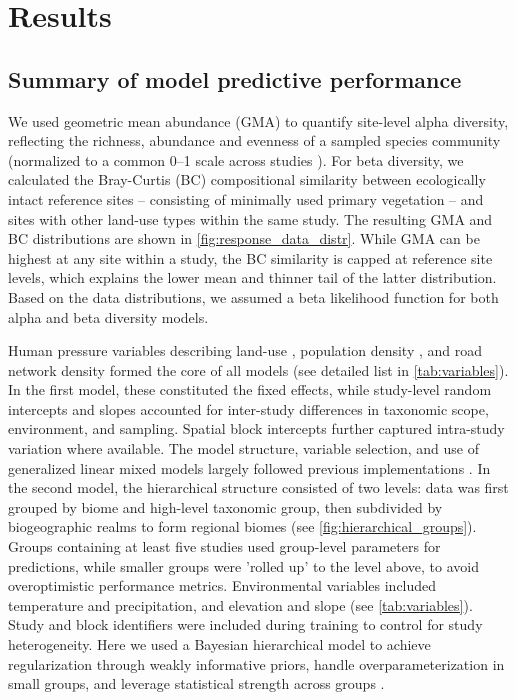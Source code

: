 \section*{Results}
\subsection*{Summary of model predictive performance}

We used geometric mean abundance (GMA) \cite{santini2017} to quantify site-level alpha diversity, reflecting the richness, abundance and evenness of a sampled species community (normalized to a common 0--1 scale across studies \cite{depalma2021}). For beta diversity, we calculated the Bray-Curtis (BC)\cite{bray1957} compositional similarity between ecologically intact reference sites -- consisting of minimally used primary vegetation -- and sites with other land-use types within the same study\cite{depalma2021}. The resulting GMA and BC distributions are shown in \autoref{fig:response_data_distr}. While GMA can be highest at any site within a study, the BC similarity is capped at reference site levels, which explains the lower mean and thinner tail of the latter distribution. Based on the data distributions, we assumed a beta likelihood function for both alpha and beta diversity models.


Human pressure variables describing land-use \cite{hudson2017}, population density \cite{gpw2017},
and road network density \cite{groads2013} formed the core of all models (see detailed list in \autoref{tab:variables}). In the first model, these constituted the fixed effects, while study-level random intercepts and slopes accounted for inter-study differences in taxonomic scope, environment, and sampling. Spatial block intercepts further captured intra-study variation where available. The model structure, variable selection, and use of generalized linear mixed models largely followed previous implementations \cite{newbold2015,depalma2021,bevan2024,schipper2020}. In the second model, the hierarchical structure consisted of two levels: data was first grouped by biome and high-level taxonomic group, then subdivided by biogeographic realms to form regional biomes\cite{bevan2024} (see \autoref{fig:hierarchical_groups}). Groups containing at least five studies used group-level parameters for predictions, while smaller groups were 'rolled up' to the level above, to avoid overoptimistic performance metrics. Environmental variables included temperature and precipitation\cite{fick2017}, and elevation and slope\cite{amatulli2018} (see \autoref{tab:variables}). Study and block identifiers were included during training to control for study heterogeneity. Here we used a Bayesian hierarchical model to achieve regularization through weakly informative priors, handle overparameterization in small groups, and leverage statistical strength across groups  \cite{dorazio2016,lemoine2019,gelman2006}.

